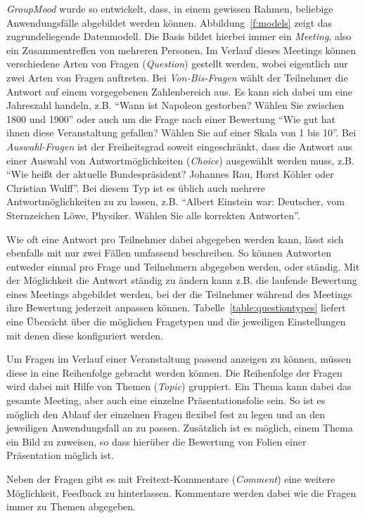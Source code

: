 \emph{GroupMood} wurde so entwickelt, dass, in einem gewissen Rahmen, beliebige Anwendungsfälle abgebildet werden können. Abbildung~\ref{f:models} zeigt das zugrundeliegende Datenmodell. Die Basis bildet hierbei immer ein \emph{Meeting}, also ein Zusammentreffen von mehreren Personen. Im Verlauf dieses Meetings können verschiedene Arten von Fragen (\emph{Question}) gestellt werden, wobei eigentlich nur zwei Arten von Fragen auftreten. Bei \emph{Von-Bis-Fragen} wählt der Teilnehmer die Antwort auf einem vorgegebenen Zahlenbereich aus. Es kann sich dabei um eine Jahreszahl handeln, z.B. "`Wann ist Napoleon gestorben? Wählen Sie zwischen 1800 und 1900"' oder auch um die Frage nach einer Bewertung "`Wie gut hat ihnen diese Veranstaltung gefallen? Wählen Sie auf einer Skala von 1 bis 10"'. Bei \emph{Auswahl-Fragen} ist der Freiheitsgrad soweit eingeschränkt, dass die Antwort aus einer Auswahl von Antwortmöglichkeiten (\emph{Choice}) ausgewählt werden muss, z.B. "`Wie heißt der aktuelle Bundespräsident? Johannes Rau, Horst Köhler oder Christian Wulff"'. Bei diesem Typ ist es üblich auch mehrere Antwortmöglichkeiten zu zu lassen, z.B. "`Albert Einstein war: Deutscher, vom Sternzeichen Löwe, Physiker. Wählen Sie alle korrekten Antworten"'.

Wie oft eine Antwort pro Teilnehmer dabei abgegeben werden kann, lässt sich ebenfalls mit nur zwei Fällen umfassend beschreiben. So können Antworten entweder einmal pro Frage und Teilnehmern abgegeben werden, oder ständig. Mit der Möglichkeit die Antwort ständig zu ändern kann z.B. die laufende Bewertung eines Meetings abgebildet werden, bei der die Teilnehmer während des Meetings ihre Bewertung jederzeit anpassen können. Tabelle~\ref{table:questiontypes} liefert eine Übersicht über die möglichen Fragetypen und die jeweiligen Einstellungen mit denen diese konfiguriert werden.

Um Fragen im Verlauf einer Veranstaltung passend anzeigen zu können, müssen diese in eine Reihenfolge gebracht werden können. Die Reihenfolge der Fragen wird dabei mit Hilfe von Themen (\emph{Topic}) gruppiert. Ein Thema kann dabei das gesamte Meeting, aber auch eine einzelne Präsentationsfolie sein. So ist es möglich den Ablauf der einzelnen Fragen flexibel fest zu legen und an den jeweiligen Anwendungsfall an zu passen. Zusätzlich ist es möglich, einem Thema ein Bild zu zuweisen, so dass hierüber die Bewertung von Folien einer Präsentation möglich ist.

Neben der Fragen gibt es mit Freitext-Kommentare (\emph{Comment}) eine weitere Möglichkeit, Feedback zu hinterlassen. Kommentare werden dabei wie die Fragen immer zu Themen abgegeben.

